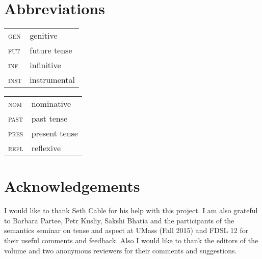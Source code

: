 \documentclass[output=paper,
modfonts,
newtxmath,
hidelinks
]{langscibook}
\begin{document}


\section*{Abbreviations}

\begin{tabularx}{.45\textwidth}{lX}
\textsc{gen}&genitive\\
\textsc{fut}&future tense\\
\textsc{inf}&infinitive\\
\textsc{inst}&instrumental\\
\end{tabularx}
\begin{tabularx}{.45\textwidth}{lX}
\textsc{nom}&nominative\\
\textsc{past}&past tense\\
\textsc{pres}&present tense\\
\textsc{refl}&reflexive\\
\end{tabularx}

\section*{Acknowledgements}

I would like to thank Seth Cable for his help with this project. I am also grateful to Barbara Partee, Petr Kusliy, Sakshi Bhatia and the participants of the semantics seminar on tense and aspect at UMass (Fall 2015) and FDSL 12 for their useful comments and feedback. Also I would like to thank the editors of the volume and two anonymous reviewers for their comments and suggestions.

\sloppy
\printbibliography[heading=subbibliography,notkeyword=this]
\end{document}
